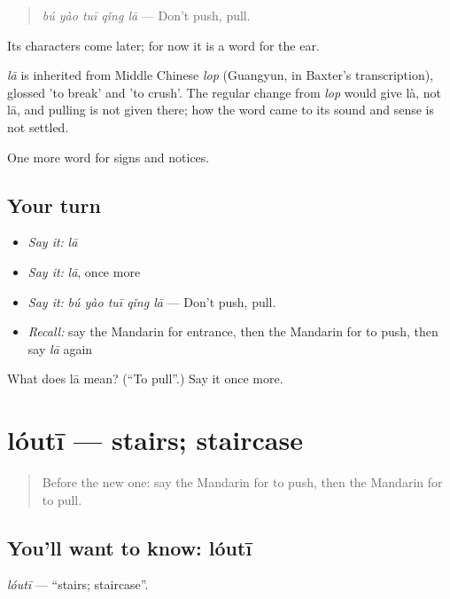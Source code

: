 \begin{quote}
\emph{bú yào tuī qǐng lā} — Don't push, pull.
\end{quote}

Its characters come later; for now it is a word for the ear.

\begin{cousinweb}
\emph{lā} is inherited from Middle Chinese \emph{lop} (Guangyun, in Baxter's transcription), glossed 'to break' and 'to crush'. The regular change from \emph{lop} would give là, not lā, and pulling is not given there; how the word came to its sound and sense is not settled.
\end{cousinweb}

\begin{grammarlens}[title={What you've built}]
One more word for signs and notices.
\end{grammarlens}

\subsection*{Your turn}
\begin{itemize}
\raggedright
  \item \emph{Say it:} \emph{lā}
  \item \emph{Say it:} \emph{lā}, once more
  \item \emph{Say it:} \emph{bú yào tuī qǐng lā} — Don't push, pull.
  \item \emph{Recall:} say the Mandarin for entrance, then the Mandarin for to push, then say \emph{lā} again
\end{itemize}

\begin{tcolorbox}[breakable,colback=teal!4,colframe=teal!35!black,title={Before you move on}]
What does lā mean? (\textquotedblleft{}To pull\textquotedblright{}.) Say it once more.
\end{tcolorbox}
\section[lóutī]{lóutī — stairs; staircase}

\label{lesson:ZH-C112-louti}



\begin{quote}
Before the new one: say the Mandarin for to push, then the Mandarin for to pull.
\end{quote}

\subsection*{You'll want to know: lóutī}
\emph{lóutī} — \textquotedblleft{}stairs; staircase\textquotedblright{}.

